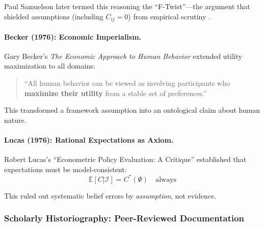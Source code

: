 Paul Samuelson later termed this reasoning the ``F-Twist''---the argument that shielded
assumptions (including $C_{ij} = 0$) from empirical scrutiny \citep{samuelson1963problems}.

\paragraph{Becker (1976): Economic Imperialism.}
Gary Becker's \textit{The Economic Approach to Human Behavior} \citep{becker1976economic}
extended utility maximization to all domains:
\begin{quote}
``All human behavior can be viewed as involving participants who \textbf{maximize their
utility} from a stable set of preferences.''
\end{quote}

This transformed a framework assumption into an ontological claim about human nature.

\paragraph{Lucas (1976): Rational Expectations as Axiom.}
Robert Lucas's ``Econometric Policy Evaluation: A Critique'' \citep{lucas1976econometric} established
that expectations must be model-consistent:
\begin{equation}
\mathbb{E}[C | \mathcal{I}] = C^*(\Psi) \quad \text{always}
\end{equation}

This ruled out systematic belief errors by \textit{assumption}, not evidence.

\subsubsection{Scholarly Historiography: Peer-Reviewed Documentation}

